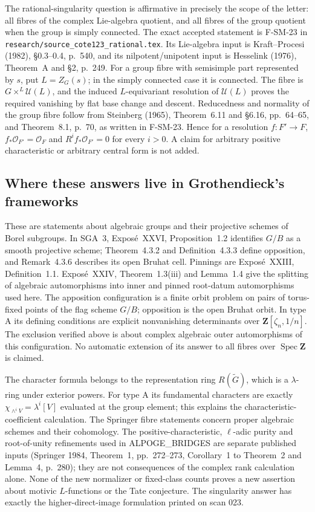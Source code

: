 The rational-singularity question is affirmative in precisely the
scope of the letter: all fibres of the complex Lie-algebra quotient,
and all fibres of the group quotient when the group is simply
connected.  The exact accepted statement is F-SM-23 in
\texttt{research/source\_cote123\_rational.tex}.  Its Lie-algebra
input is Kraft--Procesi (1982), \S0.3--0.4, p.~540, and its
nilpotent/unipotent input is Hesselink (1976), Theorem~A and \S2,
p.~249.  For a group fibre with semisimple part represented by $s$,
put $L=Z_G(s)$; in the simply connected case it is connected.
The fibre is $G\times^L\mathcal U(L)$, and the induced
$L$-equivariant resolution of $\mathcal U(L)$ proves the required
vanishing by flat base change and descent.  Reducedness and normality
of the group fibre follow from Steinberg (1965),
Theorem~6.11 and \S6.16, pp.~64--65, and Theorem~8.1, p.~70,
as written in F-SM-23.  Hence for a resolution $f:F'\to F$,
$f_*\mathcal O_{F'}=\mathcal O_F$ and
$R^if_*\mathcal O_{F'}=0$ for every $i>0$.  A claim for arbitrary
positive characteristic or arbitrary central form is not added.

\subsection{Where these answers live in Grothendieck's frameworks}
These are statements about algebraic groups and their projective
schemes of Borel subgroups.  In SGA~3, Expos\'e~XXVI,
Proposition~1.2 identifies $G/B$ as a smooth projective scheme;
Theorem~4.3.2 and Definition~4.3.3 define opposition, and
Remark~4.3.6 describes its open Bruhat cell.  Pinnings are
Expos\'e~XXIII, Definition~1.1.  Expos\'e~XXIV, Theorem~1.3(iii)
and Lemma~1.4 give the splitting of algebraic automorphisms into
inner and pinned root-datum automorphisms used here.
The apposition configuration is a finite orbit problem on pairs
of torus-fixed points of the flag scheme $G/B$; opposition is the
open Bruhat orbit.  In type A its defining conditions are explicit
nonvanishing determinants over $\mathbf Z[\zeta_n,1/n]$.
The exclusion verified above is about complex algebraic
outer automorphisms of this configuration.  No automatic extension
of its answer to all fibres over $\operatorname{Spec}\mathbf Z$
is claimed.

The character formula belongs to the representation ring
$R(\widetilde G)$, which is a $\lambda$-ring under exterior powers.
For type A its fundamental characters are exactly
$\chi_{\wedge^i V}=\lambda^i[V]$ evaluated at the group element;
this explains the characteristic-coefficient calculation.  The
Springer fibre statements concern proper algebraic schemes and
their cohomology.  The positive-characteristic, $\ell$-adic purity
and root-of-unity refinements used in ALPOGE\_BRIDGES are separate
published inputs (Springer 1984, Theorem~1, pp.~272--273,
Corollary~1 to Theorem~2 and Lemma~4, p.~280); they are not
consequences of the complex rank calculation alone.  None of the
new normalizer or fixed-class counts proves a new assertion about
motivic $L$-functions or the Tate conjecture.  The singularity
answer has exactly the higher-direct-image formulation printed
on scan 023.

